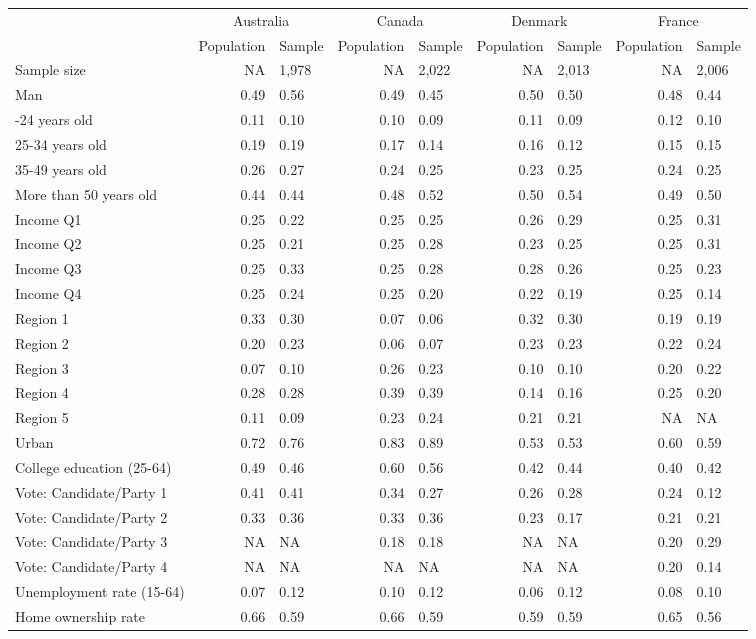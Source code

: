 
\begin{tabular}[t]{lrlrlrlrl}
\toprule
\multicolumn{1}{c}{} & \multicolumn{2}{c}{Australia} & \multicolumn{2}{c}{Canada} & \multicolumn{2}{c}{Denmark} & \multicolumn{2}{c}{France} \\
\cmidrule(l{3pt}r{3pt}){2-3} \cmidrule(l{3pt}r{3pt}){4-5} \cmidrule(l{3pt}r{3pt}){6-7} \cmidrule(l{3pt}r{3pt}){8-9}
  & Population & Sample & Population & Sample & Population & Sample & Population & Sample\\
\midrule
Sample size & NA & 1,978 & NA & 2,022 & NA & 2,013 & NA & 2,006\\
\midrule
Man & 0.49 & 0.56 & 0.49 & 0.45 & 0.50 & 0.50 & 0.48 & 0.44\\
\addlinespace
18-24 years old & 0.11 & 0.10 & 0.10 & 0.09 & 0.11 & 0.09 & 0.12 & 0.10\\
25-34 years old & 0.19 & 0.19 & 0.17 & 0.14 & 0.16 & 0.12 & 0.15 & 0.15\\
35-49 years old & 0.26 & 0.27 & 0.24 & 0.25 & 0.23 & 0.25 & 0.24 & 0.25\\
More than 50 years old & 0.44 & 0.44 & 0.48 & 0.52 & 0.50 & 0.54 & 0.49 & 0.50\\
\addlinespace
Income Q1 & 0.25 & 0.22 & 0.25 & 0.25 & 0.26 & 0.29 & 0.25 & 0.31\\
Income Q2 & 0.25 & 0.21 & 0.25 & 0.28 & 0.23 & 0.25 & 0.25 & 0.31\\
Income Q3 & 0.25 & 0.33 & 0.25 & 0.28 & 0.28 & 0.26 & 0.25 & 0.23\\
Income Q4 & 0.25 & 0.24 & 0.25 & 0.20 & 0.22 & 0.19 & 0.25 & 0.14\\
\addlinespace
Region 1 & 0.33 & 0.30 & 0.07 & 0.06 & 0.32 & 0.30 & 0.19 & 0.19\\
Region 2 & 0.20 & 0.23 & 0.06 & 0.07 & 0.23 & 0.23 & 0.22 & 0.24\\
Region 3 & 0.07 & 0.10 & 0.26 & 0.23 & 0.10 & 0.10 & 0.20 & 0.22\\
Region 4 & 0.28 & 0.28 & 0.39 & 0.39 & 0.14 & 0.16 & 0.25 & 0.20\\
Region 5 & 0.11 & 0.09 & 0.23 & 0.24 & 0.21 & 0.21 & NA & NA\\
\addlinespace
Urban & 0.72 & 0.76 & 0.83 & 0.89 & 0.53 & 0.53 & 0.60 & 0.59\\
\addlinespace
College education (25-64) & 0.49 & 0.46 & 0.60 & 0.56 & 0.42 & 0.44 & 0.40 & 0.42\\
\addlinespace
Vote: Candidate/Party 1 & 0.41 & 0.41 & 0.34 & 0.27 & 0.26 & 0.28 & 0.24 & 0.12\\
Vote: Candidate/Party 2 & 0.33 & 0.36 & 0.33 & 0.36 & 0.23 & 0.17 & 0.21 & 0.21\\
Vote: Candidate/Party 3 & NA & NA & 0.18 & 0.18 & NA & NA & 0.20 & 0.29\\
Vote: Candidate/Party 4 & NA & NA & NA & NA & NA & NA & 0.20 & 0.14\\
\addlinespace
Unemployment rate (15-64) & 0.07 & 0.12 & 0.10 & 0.12 & 0.06 & 0.12 & 0.08 & 0.10\\
\addlinespace
Home ownership rate & 0.66 & 0.59 & 0.66 & 0.59 & 0.59 & 0.59 & 0.65 & 0.56\\
\bottomrule
\end{tabular}